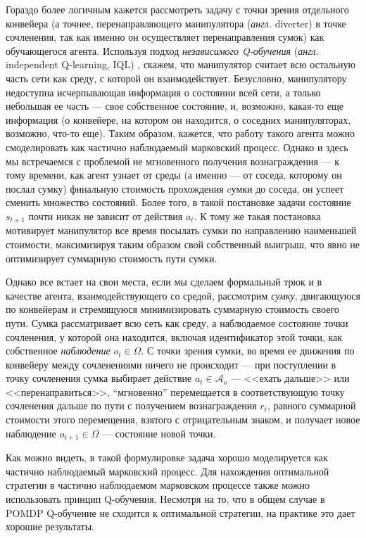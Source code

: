 \documentclass[specification,annotation,times]{itmo-student-thesis}
\theoremstyle{definition}
\begin{document}
Гораздо более логичным кажется рассмотреть задачу с точки зрения отдельного
конвейера (а точнее, перенаправляющего манипулятора (\textit{англ.} diverter) в
точке сочленения, так как именно он осуществляет перенаправления сумок) как
обучающегося агента. Используя подход \textit{независимого Q-обучения}
(\textit{англ.} independent Q-learning, IQL) \cite{tan1993multi},
скажем, что манипулятор считает всю остальную часть сети как среду, с которой
он взаимодействует. Безусловно, манипулятору недоступна исчерпывающая
информация о состоянии всей сети, а только небольшая ее часть --- свое
собственное состояние, и, возможно, какая-то еще информация (о конвейере, на
котором он находится, о соседних манипуляторах, возможно, что-то еще). Таким
образом, кажется, что работу такого агента можно смоделировать как частично
наблюдаемый марковский процесс. Однако и здесь мы встречаемся с проблемой не
мгновенного получения вознаграждения --- к тому времени, как агент узнает от
среды (а именно --- от соседа, которому он послал сумку) финальную стоимость
прохождения cумки до соседа, он успеет сменить множество состояний. Более того,
в такой постановке задачи состояние $s_{t+1}$ почти никак не зависит от действия
$a_t$. К тому же такая постановка мотивирует манипулятор все время посылать
сумки по направлению наименьшей стоимости, максимизируя таким образом свой
собственный выигрыш, что явно не оптимизирует суммарную стоимость пути сумки.

Однако все встает на свои места, если мы сделаем формальный трюк и в качестве
агента, взаимодействующего со средой, рассмотрим \textit{сумку}, двигающуюся по
конвейерам и стремящуюся минимизировать суммарную стоимость своего пути. Сумка
рассматривает всю сеть как среду, а наблюдаемое состояние точки сочленения, у
которой она находится, включая идентификатор этой точки, как собственное
\textit{наблюдение}  $o_t \in \Omega$. С точки зрения сумки, во время
ее движения по конвейеру между сочленениями ничего не происходит --- при
поступлении в точку сочленения сумка выбирает действие $a_t \in \mathcal{A}_o$
--- <<ехать дальше>> или <<перенаправиться>>, \enquote{мгновенно} перемещается в
соответствующую точку сочленения дальше по пути с получением вознаграждения $r_t$,
равного суммарной стоимости этого перемещения, взятого с отрицательным знаком, и
получает новое наблюдение $o_{t+1} \in \Omega$ --- состояние новой точки.

Как можно видеть, в такой формулировке задача хорошо моделируется как частично
наблюдаемый марковский процесс. Для нахождения оптимальной стратегии в частично
наблюдаемом марковском процессе также можно использовать принцип Q-обучения.
Несмотря на то, что в общем случае в POMDP Q-обучение не сходится к оптимальной
стратегии, на практике это дает хорошие результаты.
\end{document}
